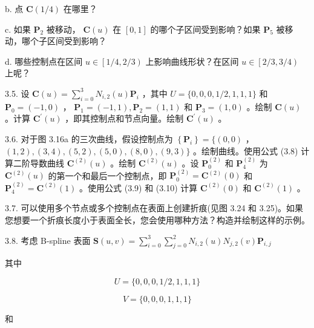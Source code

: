 \documentclass[../main.tex]{subfiles}
\begin{document}
b. 点 \(\mathbf{C}\left( {1/4}\right)\) 在哪里？

c. 如果 \({\mathbf{P}}_{2}\) 被移动， \(\mathbf{C}\left( u\right)\) 在 \(\left\lbrack  {0,1}\right\rbrack\) 的哪个子区间受到影响？如果 \({\mathbf{P}}_{5}\) 被移动，哪个子区间受到影响？

d. 哪些控制点在区间 \(u \in  \left\lbrack  {1/4,2/3}\right)\) 上影响曲线形状？在区间 \(u \in  \left\lbrack  {2/3,3/4}\right)\) 上呢？

3.5. 设 \(\mathbf{C}\left( u\right)  = \mathop{\sum }\limits_{{i = 0}}^{3}{N}_{i,2}\left( u\right) {\mathbf{P}}_{i}\) ，其中 \(U = \{ 0,0,0,1/2,1,1,1\}\) 和 \({\mathbf{P}}_{0} = \left( {-1,0}\right)\) ， \({\mathbf{P}}_{1} = \left( {-1,1}\right) ,{\mathbf{P}}_{2} = \left( {1,1}\right)\) 和 \({\mathbf{P}}_{3} = \left( {1,0}\right)\) 。绘制 \(\mathbf{C}\left( u\right)\) 。计算 \({\mathbf{C}}^{\prime }\left( u\right)\) ，即其控制点和节点向量。绘制 \({\mathbf{C}}^{\prime }\left( u\right)\) 。

3.6. 对于图 3.16a 的三次曲线，假设控制点为 \(\left\{  {\mathbf{P}}_{i}\right\}   = \{ \left( {0,0}\right)\) ， \(\left( {1,2}\right) ,\left( {3,4}\right) ,\left( {5,2}\right) ,\left( {5,0}\right) ,\left( {8,0}\right) ,\left( {9,3}\right) \}\) 。绘制曲线。使用公式 (3.8) 计算二阶导数曲线 \({\mathbf{C}}^{\left( 2\right) }\left( u\right)\) 。绘制 \({\mathbf{C}}^{\left( 2\right) }\left( u\right)\) 。设 \({\mathbf{P}}_{0}^{\left( 2\right) }\) 和 \({\mathbf{P}}_{4}^{\left( 2\right) }\) 为 \({\mathbf{C}}^{\left( 2\right) }\left( u\right)\) 的第一个和最后一个控制点，即 \({\mathbf{P}}_{0}^{\left( 2\right) } = {\mathbf{C}}^{\left( 2\right) }\left( 0\right)\) 和 \({\mathbf{P}}_{4}^{\left( 2\right) } = {\mathbf{C}}^{\left( 2\right) }\left( 1\right)\) 。使用公式 (3.9) 和 (3.10) 计算 \({\mathbf{C}}^{\left( 2\right) }\left( 0\right)\) 和 \({\mathbf{C}}^{\left( 2\right) }\left( 1\right)\) 。

3.7. 可以使用多个节点或多个控制点在表面上创建折痕(见图 3.24 和 3.25)。如果您想要一个折痕长度小于表面全长，您会使用哪种方法？构造并绘制这样的示例。

3.8. 考虑 B-spline 表面 \(\mathbf{S}\left( {u,v}\right)  = \mathop{\sum }\limits_{{i = 0}}^{3}\mathop{\sum }\limits_{{j = 0}}^{2}{N}_{i,2}\left( u\right) {N}_{j,2}\left( v\right) {\mathbf{P}}_{i,j}\)

其中

\[
U = \{ 0,0,0,1/2,1,1,1\}
\]

\[
V = \{ 0,0,0,1,1,1\}
\]

和
\end{document}
